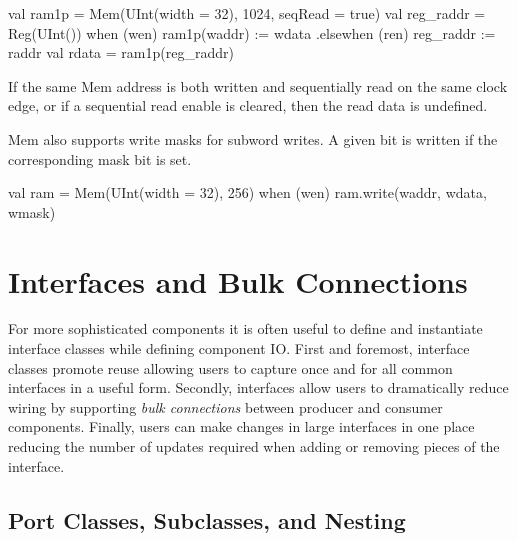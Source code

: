 \documentclass[twocolumn,10pt]{article}
\begin{document}
\begin{scala}
val ram1p = 
  Mem(UInt(width = 32), 1024, seqRead = true)
val reg_raddr = Reg(UInt())
when (wen) { ram1p(waddr) := wdata }
.elsewhen (ren) { reg_raddr := raddr }
val rdata = ram1p(reg_raddr)
\end{scala}

If the same Mem address is both written and sequentially read on the same clock
edge, or if a sequential read enable is cleared, then the read data is
undefined.

Mem also supports write masks for subword writes.  A given bit is written if
the corresponding mask bit is set.

\begin{scala}
val ram = Mem(UInt(width = 32), 256)
when (wen) { ram.write(waddr, wdata, wmask) }
\end{scala}


% 
% 


\section{Interfaces and Bulk Connections}
\label{sec:interfaces}

For more sophisticated components it is often useful to define and
instantiate interface classes while defining component IO.  First and
foremost, interface classes promote reuse allowing users to capture
once and for all common interfaces in a useful form.  Secondly,
interfaces allow users to dramatically reduce wiring by supporting
{\em bulk connections} between producer and consumer components.  Finally,
users can make changes in large interfaces in one place reducing the
number of updates required when adding or removing pieces of the
interface.

\subsection{Port Classes, Subclasses, and Nesting}
\end{document}
